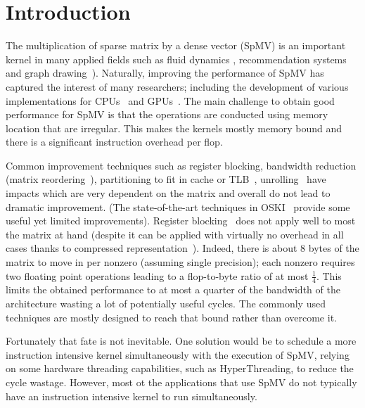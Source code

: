 \documentclass[10pt,conference,compsocconf]{IEEEtran}
\begin{document}
\IEEEpeerreviewmaketitle

\section{Introduction}
The multiplication of sparse matrix by a dense vector (SpMV) is an
important kernel in many applied fields such as fluid dynamics 
\cite{journals/tog/BolzFGS03}, recommendation systems~\cite{Brin98} and graph
drawing~\cite{Koren05}). Naturally, improving the performance of SpMV has
captured the interest of many researchers; including the development of
various implementations for 
CPUs~\cite{Buluc2009SPAA,Williams07} and GPUs~\cite{Bell08,
  conf/ipps/KreutzerHWFBB12,
  journals/concurrency/VazquezFG11,kumar2012accelerating}. The main
challenge  to obtain good performance for SpMV is that
the operations are conducted using memory location that are irregular. This makes the kernels mostly memory
bound and there is a significant instruction overhead per flop.

Common improvement techniques such as register blocking, bandwidth
reduction (matrix reordering~\cite{Cuthill69}), partitioning to fit in
cache or TLB~\cite{Nishtala07,Temam:1992:CBS:147877.148091,conf/ppsc/Toledo97},
unrolling~\cite{Mellor-Crummey04} have impacts which are very
dependent on the matrix and overall do not lead to dramatic
improvement. (The state-of-the-art techniques in OSKI~\cite{Vuduc05}
provide some useful yet limited improvements). Register blocking~\cite{conf/ppsc/Toledo97} does
not apply well to most the matrix at hand (despite it can be applied
with virtually no overhead in all cases thanks to compressed
representation~\cite{Buluc11}). Indeed, there is about 8 bytes of the matrix to move
in per nonzero (assuming single precision); each nonzero requires two
floating point operations leading to a flop-to-byte ratio of at most
$\frac{1}{4}$. This limits the obtained performance to at most a
quarter of the bandwidth of the architecture wasting a lot of
potentially useful cycles. The commonly used techniques are mostly
designed to reach that bound rather than overcome it.

Fortunately that fate is not inevitable. One solution would be to
schedule a more instruction intensive kernel simultaneously with the
execution of SpMV, relying on some hardware threading capabilities,
such as HyperThreading, to reduce the cycle wastage. However, most ot
the applications that use SpMV do not typically have an instruction
intensive kernel to run simultaneously.
\end{document}

